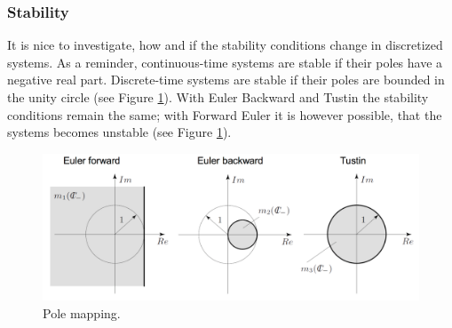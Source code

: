 \documentclass[a4paper,12 pt]{article}
\numberwithin{equation}{section}
\theoremstyle{definition}
\theoremstyle{remark}
\theoremstyle{definition}
\theoremstyle{definition}
\theoremstyle{definition}
\theoremstyle{remark}
\begin{document}
\subsubsection*{Stability}
It is nice to investigate, how and if the stability conditions change in discretized systems. As a reminder, continuous-time systems are stable if their poles have a negative real part. Discrete-time systems are stable if their poles are bounded in the unity circle (see Figure \ref{fig:polemapping}).
With Euler Backward and Tustin the stability conditions remain the same; with Forward Euler it is however possible, that the systems becomes unstable (see Figure \ref{fig:polemapping}).

\begin{figure}[h!]
\centering\includegraphics[width=0.75\columnwidth]{polemapping}
\caption{Pole mapping.}
\label{fig:polemapping}
\end{figure}
\pagebreak
\pagebreak
\end{document}
